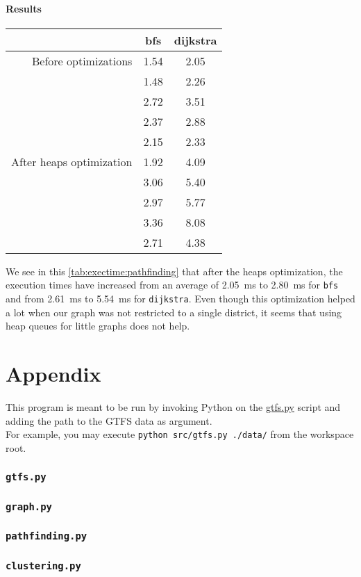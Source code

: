 \documentclass[12pt,english]{article}
\makeatletter
\let\old@appendix\appendix
\renewcommand*\appendix{
		\newpage
		\part*{Appendix}\addcontentsline{toc}{part}{Appendix}
		\old@appendix%
	}
\makeatother
\begin{document}
	\subsection{Results}\label{sec:results:2}

	\begin{center}
		\begin{tabular}{r c c}
			& \textbf{\ttfamily bfs} & \textbf{\ttfamily dijkstra}\\
			\hline\hline
			Before optimizations & \num{1.54} & \num{2.05}\\
			& \num{1.48} & \num{2.26}\\
			& \num{2.72} & \num{3.51}\\
			& \num{2.37} & \num{2.88}\\
			& \num{2.15} & \num{2.33}\\
			\hline
			After heaps optimization & \num{1.92} & \num{4.09}\\
			& \num{3.06} & \num{5.40}\\
			& \num{2.97} & \num{5.77}\\
			& \num{3.36} & \num{8.08}\\
			& \num{2.71} & \num{4.38}\\
		\end{tabular}
		\label{tab:exectime:pathfinding}
	\end{center}
	We see in this \autoref{tab:exectime:pathfinding} that after the heaps optimization, the execution times have increased from an average of \SI{2.05}{\milli\second} to \SI{2.80}{\milli\second} for \texttt{bfs} and from \SI{2.61}{\milli\second} to \SI{5.54}{\milli\second} for \texttt{dijkstra}.
	Even though this optimization helped a lot when our graph was not restricted to a single district, it seems that using heap queues for little graphs does not help.

	\appendix

	This program is meant to be run by invoking Python on the \hyperref[sec:code:gtfs]{\ttfamily gtfs.py} script and adding the path to the GTFS data as argument.\\
	For example, you may execute \texttt{python src/gtfs.py ./data/} from the workspace root.

	\section{\texttt{gtfs.py}}\label{sec:code:gtfs}
	

	\section{\texttt{graph.py}}\label{sec:code:graph}
	

	\section{\texttt{pathfinding.py}}\label{sec:code:pathfinding}
	

	\section{\texttt{clustering.py}}\label{sec:code:clustering}
	
\end{document}
